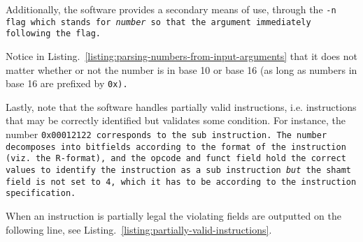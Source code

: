 Additionally, the software provides a secondary means of use, through
the \tt{-n} flag which stands for \emph{number} so that the argument
immediately following the flag.

Notice in Listing.~\ref{listing:parsing-numbers-from-input-arguments}
that it does not matter whether or not the number is in base 10 or
base 16 (as long as numbers in base 16 are prefixed by \tt{0x}).

Lastly, note that the software handles partially valid instructions,
i.e. instructions that may be correctly identified but validates some
condition. For instance, the number \tt{0x00012122} corresponds to the
\tt{sub} instruction. The number decomposes into bitfields according
to the format of the instruction (viz. the R-format), and the opcode
and funct field hold the correct values to identify the instruction as
a \tt{sub} instruction \emph{but} the \tt{shamt} field is not set to
4, which it has to be according to the instruction specification.

When an instruction is partially legal the violating fields are outputted
on the following line, see Listing.~\ref{listing:partially-valid-instructions}.


